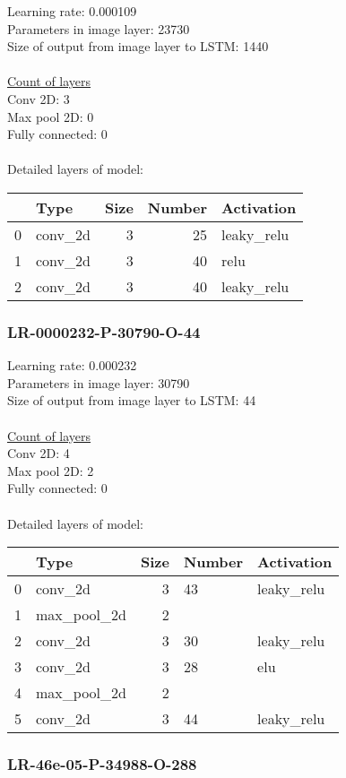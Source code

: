 Learning rate: 0.000109
\\Parameters in image layer: 23730
\\Size of output from image layer to LSTM: 1440
\\\\\underline{Count of layers} 
\\Conv 2D:           3\\Max pool 2D:      0\\Fully connected:  0
\\\\Detailed layers of model: \\\begin{tabular}{rlrrl}
\hline
    & Type    &   Size &   Number & Activation   \\
\hline
  0 & conv\_2d &      3 &       25 & leaky\_relu   \\
  1 & conv\_2d &      3 &       40 & relu         \\
  2 & conv\_2d &      3 &       40 & leaky\_relu   \\
\hline
\end{tabular}\subsubsection*{LR-0000232-P-30790-O-44}
Learning rate: 0.000232
\\Parameters in image layer: 30790
\\Size of output from image layer to LSTM: 44
\\\\\underline{Count of layers} 
\\Conv 2D:           4\\Max pool 2D:      2\\Fully connected:  0
\\\\Detailed layers of model: \\\begin{tabular}{rlrll}
\hline
    & Type        &   Size & Number   & Activation   \\
\hline
  0 & conv\_2d     &      3 & 43       & leaky\_relu   \\
  1 & max\_pool\_2d &      2 &          &              \\
  2 & conv\_2d     &      3 & 30       & leaky\_relu   \\
  3 & conv\_2d     &      3 & 28       & elu          \\
  4 & max\_pool\_2d &      2 &          &              \\
  5 & conv\_2d     &      3 & 44       & leaky\_relu   \\
\hline
\end{tabular}\subsubsection*{LR-46e-05-P-34988-O-288}
